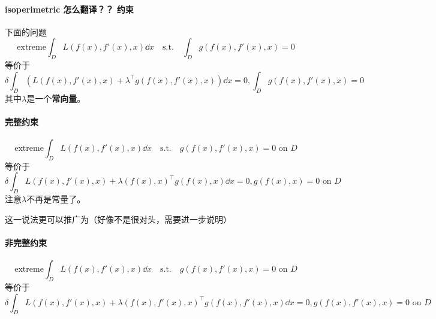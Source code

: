 \documentclass[UTF8]{ctexart}
\newcommand*{\st}{\quad \text{s.t.} \quad}
\begin{document}
\paragraph{isoperimetric 怎么翻译？？ 约束} 下面的问题
\begin{equation}
    \mathrm{extreme} \int_D L(f(x), f'(x), x) \dd x \st \int_D g(f(x), f'(x), x)=0
\end{equation}
等价于
\begin{equation}
    \delta \int_D \left(L(f(x), f'(x), x) + \lambda^\top g(f(x), f'(x), x)\right) \dd x = 0, 
    \int_D g(f(x), f'(x), x)=0
\end{equation}
其中$\lambda$是一个\textbf{常向量}。

\paragraph{完整约束}
\begin{equation}
    \mathrm{extreme} \int_D L(f(x), f'(x), x) \dd x \st g(f(x), f'(x), x) = 0 \text{ on } D
\end{equation}
等价于
\begin{equation}
    \delta \int_D L(f(x), f'(x), x) + \lambda(f(x), x)^\top g(f(x), x) \dd x = 0,
    g(f(x), x) = 0 \text{ on } D
\end{equation}
注意$\lambda$不再是常量了。

这一说法更可以推广为（好像不是很对头，需要进一步说明）
\paragraph{非完整约束} \begin{equation}
    \mathrm{extreme} \int_D L(f(x), f'(x), x) \dd x \st g(f(x), f'(x), x) = 0 \text{ on } D
\end{equation}
等价于
\begin{equation}
    \delta \int_D L(f(x), f'(x), x) + \lambda(f(x), f'(x), x)^\top g(f(x), f'(x), x) \dd x = 0,
    g(f(x), f'(x), x) = 0 \text{ on } D
\end{equation}
\end{document}
